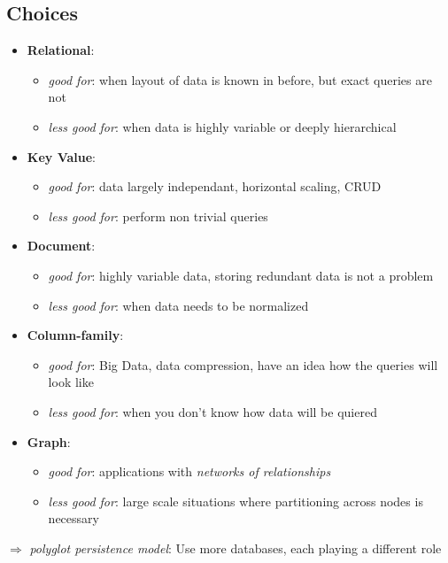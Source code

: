 \documentclass[a4paper]{article}
\begin{document}
\begin{multicols}{3}
\subsection{Choices}
\begin{itemize}
    \item \textbf{Relational}: 
        \begin{itemize}
            \item \textit{good for}: when layout of data is known in before, but exact queries are not
            \item \textit{less good for}: when data is highly variable or deeply hierarchical
        \end{itemize}
    \item \textbf{Key Value}: 
        \begin{itemize}
            \item \textit{good for}: data largely independant, horizontal scaling, CRUD
            \item \textit{less good for}: perform non trivial queries
        \end{itemize}
    \item \textbf{Document}: 
        \begin{itemize}
            \item \textit{good for}: highly variable data, storing redundant data is not a problem
            \item \textit{less good for}: when data needs to be normalized
        \end{itemize}
    \item \textbf{Column-family}: 
        \begin{itemize}
            \item \textit{good for}: Big Data, data compression, have an idea how the queries will look like
            \item \textit{less good for}: when you don't know how data will be quiered
        \end{itemize}
    \item \textbf{Graph}: 
        \begin{itemize}
            \item \textit{good for}: applications with \textit{networks of relationships}
            \item \textit{less good for}: large scale situations where partitioning across nodes is necessary
        \end{itemize}
\end{itemize}
$\Rightarrow$ \textit{polyglot persistence model}: Use more databases, each playing a different role


\end{multicols}
\end{document}
